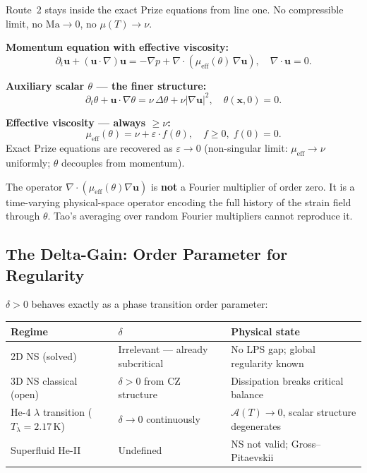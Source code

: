 \documentclass[11pt, a4paper]{article}
\theoremstyle{definition}
\theoremstyle{remark}
\newcommand{\Afield}{\mathcal{A}}
\newcommand{\eps}{\varepsilon}
\newcommand{\thet}{\theta}
\newcommand{\mueff}{\mu_{\mathrm{eff}}}
\newcommand{\delt}{\delta}
\begin{document}
Route~2 stays inside the exact Prize equations from line one.
No compressible limit, no $\text{Ma}\to 0$, no $\mu(T)\to\nu$.

\medskip
\noindent\textbf{Momentum equation with effective viscosity:}
\begin{equation}
  \partial_t\mathbf{u} + (\mathbf{u}\cdot\nabla)\mathbf{u}
    = -\nabla p + \nabla\cdot(\mueff(\thet)\,\nabla\mathbf{u}), \quad
  \nabla\cdot\mathbf{u} = 0.
  \label{eq:route2-momentum}
\end{equation}

\noindent\textbf{Auxiliary scalar $\thet$ --- the finer structure:}
\begin{equation}
  \partial_t\thet + \mathbf{u}\cdot\nabla\thet
    = \nu\,\Delta\thet + \nu|\nabla\mathbf{u}|^2, \quad
  \thet(\mathbf{x},0) = 0.
  \label{eq:route2-theta}
\end{equation}

\noindent\textbf{Effective viscosity --- always $\geq\nu$:}
\begin{equation}
  \mueff(\thet) = \nu + \eps\cdot f(\thet), \quad
  f \geq 0,\; f(0) = 0.
  \label{eq:mueff}
\end{equation}
Exact Prize equations are recovered as $\eps\to 0$ (non-singular limit:
$\mueff \to \nu$ uniformly; $\thet$ decouples from momentum).

\medskip
The operator $\nabla\cdot(\mueff(\thet)\nabla\mathbf{u})$ is \textbf{not} a Fourier
multiplier of order zero. It is a time-varying physical-space operator
encoding the full history of the strain field through $\thet$.
Tao's averaging over random Fourier multipliers cannot reproduce it.

\subsection{The Delta-Gain: Order Parameter for Regularity}

$\delt > 0$ behaves exactly as a phase transition order parameter:

\begin{center}
\begin{tabular}{lll}
\toprule
\textbf{Regime} & \textbf{$\delt$} & \textbf{Physical state} \\
\midrule
2D NS (solved) & Irrelevant --- already subcritical & No LPS gap; global regularity known \\
3D NS classical (open) & $\delt > 0$ from CZ structure & Dissipation breaks critical balance \\
He-4 $\lambda$ transition ($T_\lambda = 2.17$\,K) & $\delt \to 0$ continuously & $\Afield(T)\to 0$, scalar structure degenerates \\
Superfluid He-II & Undefined & NS not valid; Gross--Pitaevskii \\
\bottomrule
\end{tabular}
\end{center}
\end{document}
